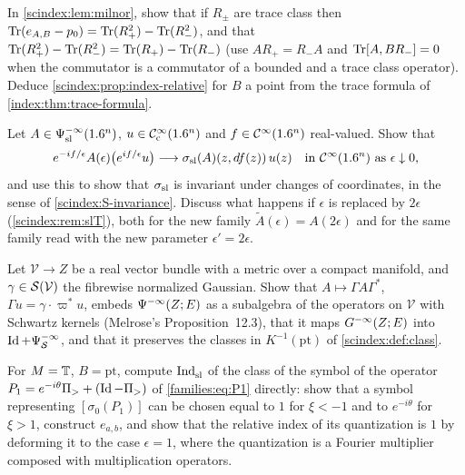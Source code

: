 \begin{exercise}\label{scindex:ex:milnor-trace}
  In \cref{scindex:lem:milnor}, show that if $R_\pm$ are trace class then
  $\operatorname{Tr}(e_{A,B}-p_0)=\operatorname{Tr}(R_+^2)-\operatorname{Tr}(R_-^2)$, and that $\operatorname{Tr}(R_+^2)-\operatorname{Tr}(R_-^2)=
  \operatorname{Tr}(R_+)-\operatorname{Tr}(R_-)$ (use $AR_+=R_-A$ and $\operatorname{Tr}[A,BR_-]=0$ when the
  commutator is a commutator of a bounded and a trace class operator). Deduce
  \cref{scindex:prop:index-relative} for $B$ a point from the trace formula of
  \cref{index:thm:trace-formula}.
\end{exercise}

\begin{exercise}\label{scindex:ex:oscillatory}
  Let $A\in\Psi^{-\infty}_{\mathrm{sl}}(1.6^n)$, $u\in\mathcal{C}^\infty_{\mathrm{c}}(1.6^n)$ and $f\in\mathcal{C}^\infty(1.6^n)$
  real-valued. Show that
  \begin{equation*}
    e^{-if/\epsilon}A(\epsilon)\bigl(e^{if/\epsilon}u\bigr)\longrightarrow
    \sigma_{\mathrm{sl}}(A)(z,df(z))\,u(z)\quad\text{in }\mathcal{C}^\infty(1.6^n)\text{ as }\epsilon\downarrow0,
  \end{equation*}
  and use this to show that $\sigma_{\mathrm{sl}}$ is invariant under changes of coordinates,
  in the sense of \ref{scindex:S-invariance}. Discuss what happens if
  $\epsilon$ is replaced by $2\epsilon$ (\cref{scindex:rem:slT}), both for the new
  family $\tilde A(\epsilon)=A(2\epsilon)$ and for the same family read with the
  new parameter $\epsilon'=2\epsilon$.
\end{exercise}

\begin{exercise}\label{scindex:ex:ground-state}
  Let $\mathcal V\to Z$ be a real vector bundle with a metric over a compact
  manifold, and $\gamma\in\mathcal{S}(\mathcal V)$ the fibrewise normalized Gaussian.
  Show that $A\mapsto\Gamma A\Gamma^*$, $\Gamma u=\gamma\cdot\varpi^*u$, embeds
  $\Psi^{-\infty}(Z;E)$ as a subalgebra of the operators on $\mathcal V$ with
  Schwartz kernels (Melrose's Proposition~12.3), that it maps $G^{-\infty}(Z;E)$ into
  $\operatorname{Id}+\Psi^{-\infty}_{\mathcal S}$, and that it preserves the classes in
  $K^{-1}(\mathrm{pt})$ of \cref{scindex:def:class}.
\end{exercise}

\begin{exercise}\label{scindex:ex:circle}
  For $M=\mathbb{T}$, $B=\mathrm{pt}$, compute $\operatorname{Ind}^{}_{\mathrm{sl}}$ of the class of the symbol of
  the operator $P_1=e^{-i\theta}\Pi_>+(\operatorname{Id}-\Pi_>)$ of \eqref{families:eq:P1} directly:
  show that a symbol representing $[\sigma_0(P_1)]$ can be chosen equal to $1$ for
  $\xi<-1$ and to $e^{-i\theta}$ for $\xi>1$, construct $e_{a,b}$, and show that
  the relative index of its quantization is $1$ by deforming it to the case
  $\epsilon=1$, where the quantization is a Fourier multiplier composed with
  multiplication operators.
\end{exercise}

